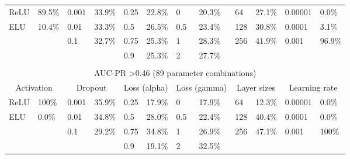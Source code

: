 \documentclass[ppgc, diss, english]{iiufrgs}
\begin{document}
\begin{table}[!th]
\begin{adjustbox}{scale=0.9,center}
\begin{tabular}{llllllllllll}
ReLU          & 89.5\%         & 0.001        & 33.9\%       & 0.25           & 22.8\%          & 0             & 20.3\%           & 64            & 27.1\%          & 0.00001          & 0.0\%          \\
ELU           & 10.4\%         & 0.01         & 33.3\%       & 0.5            & 26.5\%          & 0.5           & 23.4\%           & 128           & 30.8\%          & 0.0001           & 3.1\%          \\
              &                & 0.1          & 32.7\%       & 0.75           & 25.3\%          & 1             & 28.3\%           & 256           & 41.9\%          & 0.001            & 96.9\%         \\
              &                &              &              & 0.9            & 25.3\%          & 2             & 27.7\%           &               &                 &                  &                \\
              &                &              &              &                &                 &               &                  &               &                 &                  &                \\ \hline
\multicolumn{12}{c}{AUC-PR \textgreater 0.46 (89 parameter combinations)}                                                                                                                                \\ \hline
\multicolumn{2}{c}{Activation} & \multicolumn{2}{c}{Dropout} & \multicolumn{2}{c}{Loss (alpha)} & \multicolumn{2}{c}{Loss (gamma)} & \multicolumn{2}{c}{Layer sizes} & \multicolumn{2}{c}{Learning rate} \\
ReLU          & 100\%          & 0.001        & 35.9\%       & 0.25           & 17.9\%          & 0             & 17.9\%           & 64            & 12.3\%          & 0.00001          & 0.0\%          \\
ELU           & 0.0\%          & 0.01         & 34.8\%       & 0.5            & 28.0\%          & 0.5           & 22.4\%           & 128           & 40.4\%          & 0.0001           & 0.0\%          \\
              &                & 0.1          & 29.2\%       & 0.75           & 34.8\%          & 1             & 26.9\%           & 256           & 47.1\%          & 0.001            & 100\%          \\
              &                &              &              & 0.9            & 19.1\%          & 2             & 32.5\%           &               &                 &                  &                \\ \hline
\end{tabular}
\end{adjustbox}
\end{table}
\end{document}
